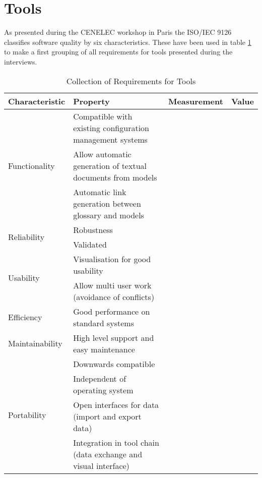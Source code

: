 \section{Tools}

As presented during the CENELEC workshop in Paris the ISO/IEC 9126 classifies software quality by six characteristics.  These have been used in table \ref{tab:reqtools} to make a first grouping of all requirements for tools presented during the interviews. 

\begin{table}[htp]

\caption{Collection of Requirements for Tools}
\label{tab:reqtools}

\begin{tabular}{|m{4cm}|m{5.5cm}|m{2.5cm}|m{1cm}|}
\hline
\textbf{Characteristic} & \textbf{Property} & \textbf{Measurement} & \textbf{Value} \\ \hline
\multirow{3}{*}{Functionality} &  Compatible with existing configuration management systems & & \\ \cline{2-4}
				& Allow automatic generation of textual documents from models & & \\ \cline{2-4}
				& Automatic link generation between glossary and models & & \\ \hline
\multirow{2}{*}{Reliability} & Robustness & & \\ \cline{2-4}
				& Validated & & \\ \hline
\multirow{2}{*}{Usability} & Visualisation for good usability & & \\  \cline{2-4}
				& Allow multi user work (avoidance of conflicts) & & \\ \hline
\multirow{1}{*}{Efficiency} & Good performance on standard systems & &  \\ \hline
\multirow{1}{*}{Maintainability} & High level support and easy maintenance & & \\ \hline
\multirow{4}{*}{Portability} &  Downwards compatible & & \\ \cline{2-4}
				& Independent of operating system & &  \\ \cline{2-4}
				& Open interfaces for data (import and export data) & &\\ \cline{2-4}
				& Integration in tool chain (data exchange and visual interface) & & \\ \hline

\end{tabular}
\end{table}